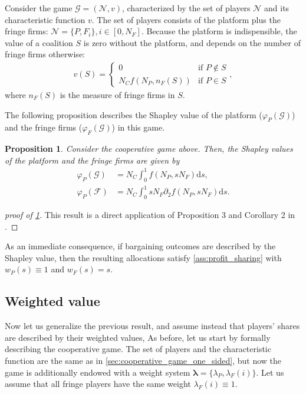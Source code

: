 \documentclass[a4paper]{article}
\newtheorem{proposition}{Proposition}
\newcommand{\ds}{\mathrm{d}s}
\begin{document}
Consider the game $\mathcal{G} = (\mathcal{N}, v)$, characterized by the set of players $\mathcal{N}$ and its characteristic function $v$.
The set of players consists of the platform plus the fringe firms: $\mathcal{N} = \{P, F_i\}, i \in [0, N_F]$.
Because the platform is indispensible, the value of a coalition $S$ is zero without the platform, and depends on the number of fringe firms otherwise:
\begin{align*}
    v(S) = \begin{cases}
        0 & \text{if } P \notin S \\
        N_C f(N_P, n_F(S)) & \text{if } P \in S
    \end{cases},
\end{align*}
where $n_F(S)$ is the measure of fringe firms in $S$.

The following proposition describes the Shapley value of the platform ($\varphi_P(\mathcal{G})$) and the fringe firms ($\varphi_F(\mathcal{G})$) in this game.

\begin{proposition}
    \label{prop:profit_sharing_one_sided}
    Consider the cooperative game above.
    Then, the Shapley values of the platform and the fringe firms are given by
    \begin{align*}
        \varphi_P(\mathcal{G}) &= N_C \int_0^1 f(N_P, s N_F) \ds, \\
        \varphi_P(\mathcal{F}) &= N_C \int_0^1 s N_F \partial_2 f(N_P, s N_F) \ds.
    \end{align*}
\end{proposition}

\begin{proof}[proof of \cref{prop:profit_sharing_one_sided}]
    This result is a direct application of Proposition 3 and Corollary 2 in \textcite{stancsics2023value}.
\end{proof}

As an immediate consequence, if bargaining outcomes are described by the Shapley value, then the resulting allocations satisfy \cref{ass:profit_sharing} with $w_P(s) \equiv 1$ and $w_F(s) = s$.


\subsection{Weighted value}
\label{sec:cooperative_game_weighted}

Now let us generalize the previous result, and assume instead that players' shares are described by their weighted values,
As before, let us start by formally describing the cooperative game.
The set of players and the characteristic function are the same as in \cref{sec:cooperative_game_one_sided}, but now the game is additionally endowed with a weight system $\mathbf{\lambda} = \{\lambda_P, \lambda_{F}(i)\}$.
Let us assume that all fringe players have the same weight $\lambda_{F}(i) \equiv 1$.
\end{document}
